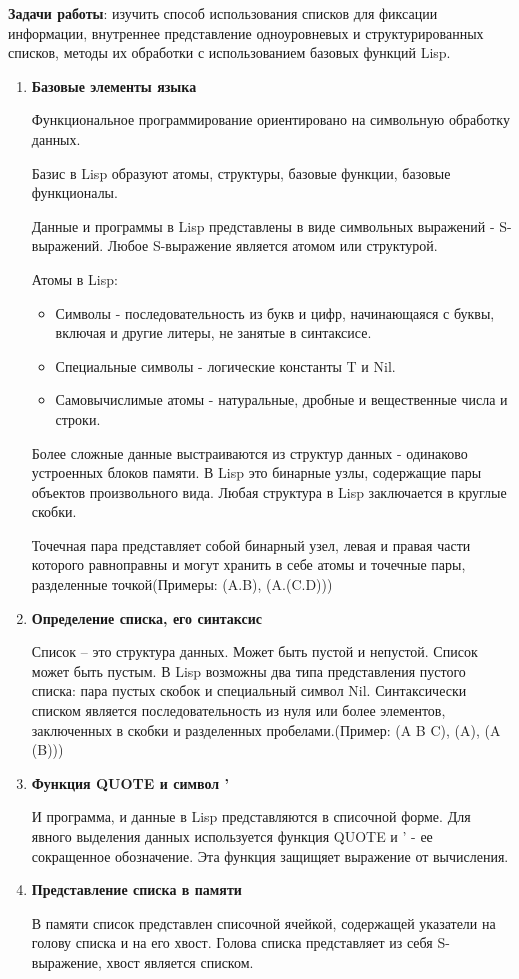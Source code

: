 \textbf{Задачи работы}: изучить способ использования списков для фиксации информации, внутреннее представление одноуровневых и структурированных списков, методы их обработки с использованием базовых функций Lisp.
\begin{enumerate}
\item \textbf{Базовые элементы языка}

Функциональное программирование ориентировано на символьную обработку данных. 

Базис в Lisp образуют атомы, структуры, базовые функции, базовые функционалы.

Данные и программы в Lisp представлены в виде символьных выражений - S-выражений. Любое S-выражение является атомом или структурой.

Атомы в Lisp:
\begin{itemize}
\item Символы - последовательность из букв и цифр, начинающаяся с буквы, включая и другие литеры, не занятые в синтаксисе.
\item Специальные символы - логические константы T и Nil.
\item Самовычислимые атомы - натуральные, дробные и вещественные числа и строки.
\end{itemize}

Более сложные данные выстраиваются из структур данных - одинаково устроенных блоков памяти. В Lisp это бинарные узлы, содержащие пары объектов произвольного вида. Любая структура в Lisp заключается в круглые скобки.

Точечная пара представляет собой бинарный узел, левая и правая части которого равноправны и могут хранить в себе атомы и точечные пары, разделенные точкой(Примеры: (A.B), (A.(C.D)))

\item \textbf{Определение списка, его синтаксис}

Список – это структура данных. Может быть пустой и непустой. Список может быть пустым. В  Lisp возможны два типа представления пустого списка: пара пустых скобок и специальный символ Nil. Синтаксически списком является последовательность из нуля или более элементов, заключенных в скобки и разделенных пробелами.(Пример: (A B C), (A), (A (B)))

\newpage
\item \textbf{Функция QUOTE и символ '}

И программа, и данные в Lisp представляются в списочной форме. Для явного выделения данных используется функция QUOTE и ' - ее сокращенное обозначение. Эта функция защищяет выражение от вычисления.

\item \textbf{Представление списка в памяти}

В памяти список представлен списочной ячейкой, содержащей указатели на голову списка и на его хвост. Голова списка представляет из себя S-выражение, хвост является списком.\\

\end{enumerate}

